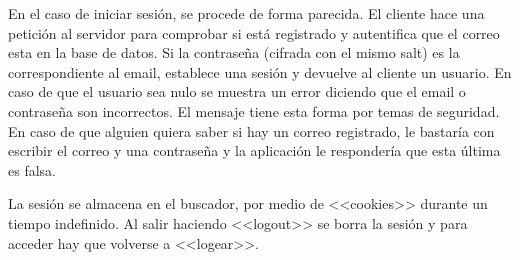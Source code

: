 En el caso de iniciar sesión, se procede de forma parecida. El cliente hace una petición al servidor para comprobar si está registrado y autentifica que el correo esta en la base de datos. Si la contraseña (cifrada con el mismo salt) es la correspondiente al email, establece una sesión y devuelve al cliente un usuario. En caso de que el usuario sea nulo se muestra un error diciendo que el email o contraseña son incorrectos. El mensaje tiene esta forma por temas de seguridad. En caso de que alguien quiera saber si hay un correo registrado, le bastaría con escribir el correo y una contraseña y la aplicación le respondería que esta última es falsa.

La sesión se almacena en el buscador, por medio de <<cookies>> durante un tiempo indefinido. Al salir haciendo <<logout>> se borra la sesión y para acceder hay que volverse a <<logear>>.
